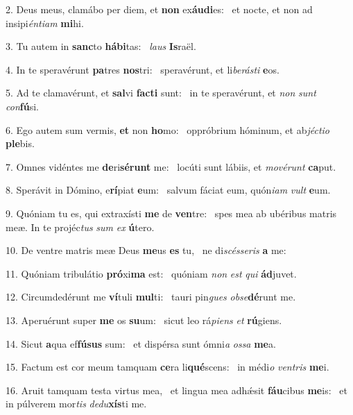 2. Deus meus, clamábo per diem, et \textbf{non} ex\textbf{áu}\textbf{di}es: \ast\  et nocte, et non ad insipi\textit{én}\textit{ti}\textit{am} \textbf{mi}hi.\

3. Tu autem in \textbf{sanc}to \textbf{há}\textbf{bi}tas: \ast\  \textit{laus} \textbf{Is}raël.\

4. In te speravérunt \textbf{pa}tres \textbf{nos}tri: \ast\  speravérunt, et li\textit{be}\textit{rás}\textit{ti} \textbf{e}os.\

5. Ad te clamavérunt, et \textbf{sal}vi \textbf{fac}\textbf{ti} sunt: \ast\  in te speravérunt, et \textit{non} \textit{sunt} \textit{con}\textbf{fú}si.\

6. Ego autem sum vermis, \textbf{et} non \textbf{ho}mo: \ast\  oppróbrium hóminum, et ab\textit{jéc}\textit{ti}\textit{o} \textbf{ple}bis.\

7. Omnes vidéntes me \textbf{de}ri\textbf{sé}\textbf{runt} me: \ast\  locúti sunt lábiis, et \textit{mo}\textit{vé}\textit{runt} \textbf{ca}put.\

8. Sperávit in Dómino, e\textbf{rí}piat \textbf{e}um: \ast\  salvum fáciat eum, quón\textit{i}\textit{am} \textit{vult} \textbf{e}um.\

9. Quóniam tu es, qui extraxísti \textbf{me} de \textbf{ven}tre: \ast\  spes mea ab ubéribus matris meæ. In te projéc\textit{tus} \textit{sum} \textit{ex} \textbf{ú}tero.\

10. De ventre matris meæ Deus \textbf{me}us \textbf{es} tu, \ast\  ne di\textit{scés}\textit{se}\textit{ris} \textbf{a} me:\

11. Quóniam tribulátio \textbf{pró}xi\textbf{ma} est: \ast\  quóniam \textit{non} \textit{est} \textit{qui} \textbf{ád}juvet.\

12. Circumdedérunt me \textbf{ví}tuli \textbf{mul}ti: \ast\  tauri pin\textit{gues} \textit{ob}\textit{se}\textbf{dé}runt me.\

13. Aperuérunt super \textbf{me} os \textbf{su}um: \ast\  sicut leo rá\textit{pi}\textit{ens} \textit{et} \textbf{rú}giens.\

14. Sicut \textbf{a}qua ef\textbf{fú}\textbf{sus} sum: \ast\  et dispérsa sunt ómni\textit{a} \textit{os}\textit{sa} \textbf{me}a.\

15. Factum est cor meum tamquam \textbf{ce}ra li\textbf{qué}scens: \ast\  in médi\textit{o} \textit{ven}\textit{tris} \textbf{me}i.\

16. Aruit tamquam testa virtus mea, \dag\  et lingua mea adhǽsit \textbf{fáu}cibus \textbf{me}is: \ast\  et in púlverem mor\textit{tis} \textit{de}\textit{du}\textbf{xís}ti me.\


